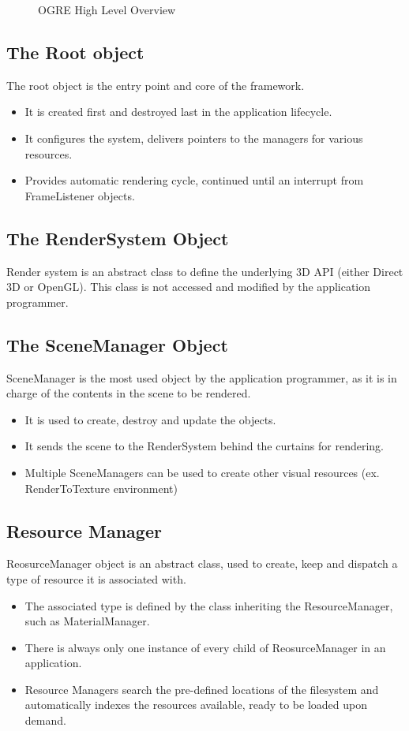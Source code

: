 \begin{figure}[h]
\centerline{}
\caption{OGRE High Level Overview}
\label{fig:ogre-class-diagram}
\end{figure}

\subsection{The Root object}
The root object is the entry point and core of the framework.
\begin{itemize}
\item It is created first and destroyed last in the application lifecycle. 
\item It configures the system, delivers pointers to the managers for various resources.
\item Provides automatic rendering cycle, continued until an interrupt from FrameListener objects.
\end{itemize}

\subsection{The RenderSystem Object}
Render system is an abstract class to define the underlying 3D API (either Direct 3D or OpenGL). This class is not accessed and modified by the application programmer.

\subsection{The SceneManager Object}
SceneManager is the most used object by the application programmer, as it is in charge of the contents in the scene to be rendered.
\begin{itemize}
\item It is used to create, destroy and update the objects.
\item It sends the scene to the RenderSystem behind the curtains for rendering.
\item Multiple SceneManagers can be used to create other visual resources (ex. RenderToTexture environment)
\end{itemize}

\subsection{Resource Manager}
ReosurceManager object is an abstract class, used to create, keep and dispatch a type of resource it is associated with. 
\begin{itemize}
\item The associated type is defined by the class inheriting the ResourceManager, such as MaterialManager.
\item There is always only one instance of every child of ReosurceManager in an application.
\item Resource Managers search the pre-defined locations of the filesystem and automatically indexes the resources available, ready to be loaded upon demand.
\end{itemize}



